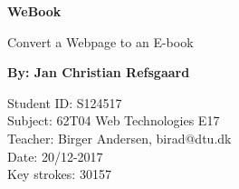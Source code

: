 \documentclass[]{report}   %
\begin{document}
\sloppy

					
\lstset{language=python,upquote=true}
\setlength\parindent{0pt}

\begin{titlepage}
    \begin{center}
        \vspace*{1cm}
        \Huge
        \textbf{WeBook}
        
        \vspace{0.5cm}
        \LARGE
        Convert a Webpage to an E-book
        
        \vspace{1.5cm}
        \textbf{By: Jan Christian Refsgaard}
        
        \vfill
        \vspace{0.8cm}
        
        \Large
        Student ID: S124517 \\
        Subject: 62T04 Web Technologies E17 \\
        Teacher: Birger Andersen, birad@dtu.dk \\
        Date: 20/12-2017 \\
        Key strokes: 30157\\
        
    \end{center}
\end{titlepage}


\tableofcontents

\end{document}
